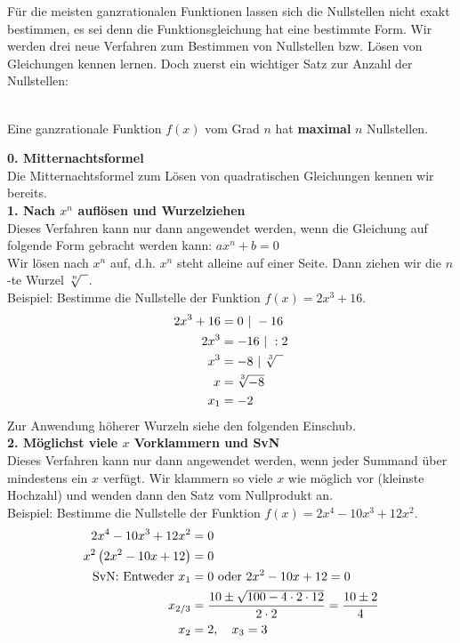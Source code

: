Für die meisten ganzrationalen Funktionen lassen sich die Nullstellen nicht exakt bestimmen, es sei denn die Funktionsgleichung hat eine bestimmte Form. Wir werden drei neue Verfahren zum Bestimmen von Nullstellen bzw. Lösen von Gleichungen kennen lernen. Doch zuerst ein wichtiger Satz zur Anzahl der Nullstellen:
\begin{tcolorbox}\centering
	\textcolor{loestc}{\vspace{0.3cm}\\Eine ganzrationale Funktion \(f(x)\) vom Grad \(n\) hat \textbf{maximal} \(n\) Nullstellen.\\ \vspace{0.5cm}}
\end{tcolorbox}
\textbf{0. Mitternachtsformel}\\
Die Mitternachtsformel zum Lösen von quadratischen Gleichungen kennen wir bereits.\\
\textbf{1. Nach \(x^n\) auflösen und Wurzelziehen}\\
Dieses Verfahren kann nur dann angewendet werden, wenn die Gleichung auf folgende Form gebracht werden kann: \(ax^n+b=0\)\\
Wir lösen nach \(x^n\) auf, d.h. \(x^n\) steht alleine auf einer Seite. Dann ziehen wir die \(n\)-te Wurzel \(\sqrt[\leftroot{0}\uproot{2}n]{\phantom{x}}\).\\
Beispiel: Bestimme die Nullstelle der Funktion \(f(x)=2x^3+16\).
\textcolor{loes}{\begin{align*}\large
		2x^3+16&=0\ \vert\ -16\\
		2x^3&=-16\ \vert\ :2\\
		x^3&=-8\ \vert\ \sqrt[\leftroot{0}\uproot{2}3]{\phantom{x}}\\
		x&=\sqrt[\leftroot{0}\uproot{2}3]{-8}\\
		x_1&=-2
\end{align*}}
Zur Anwendung höherer Wurzeln siehe den folgenden Einschub.\\
\textbf{2. Möglichst viele \(x\) Vorklammern und SvN}\\
Dieses Verfahren kann nur dann angewendet werden, wenn jeder Summand über mindestens ein \(x\) verfügt. Wir klammern so viele \(x\) wie möglich vor (kleinste Hochzahl) und wenden dann den Satz vom Nullprodukt an.\\
Beispiel: Bestimme die Nullstelle der Funktion \(f(x)=2x^4-10x^3+12x^2\).
\textcolor{loes}{\begin{align*}\large
		2x^4-10x^3+12x^2&=0\\
		x^2\left(2x^2-10x+12\right) &=0\\
		\text{SvN: Entweder }x_1&=0 \text{ oder }2x^2-10x+12=0\\
		x_{2/3}&=\frac{10\pm\sqrt{100-4\cdot 2\cdot 12}}{2\cdot 2}=\frac{10\pm 2}{4}\\
		x_2&=2,\quad x_3=3
\end{align*}}\newpage
